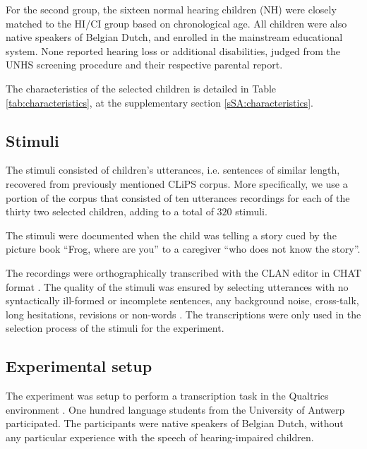 For the second group, the sixteen normal hearing children (NH) were closely matched to the HI/CI group based on chronological age. All children were also native speakers of Belgian Dutch, and enrolled in the mainstream educational system. None reported hearing loss or additional disabilities, judged from the UNHS screening procedure and their respective parental report.

The characteristics of the selected children is detailed in Table \ref{tab:characteristics}, at the supplementary section \ref{sSA:characteristics}. 
%
%
\subsection{Stimuli} \label{sS:stimuli}
%
The stimuli consisted of children's utterances, i.e. sentences of similar length, recovered from previously mentioned CLiPS corpus. More specifically, we use a portion of the corpus that consisted of ten utterances recordings for each of the thirty two selected children, adding to a total of $320$ stimuli. 

The stimuli were documented when the child was telling a story cued by the picture book ``Frog, where are you'' \citep{Mayer_1969} to a caregiver ``who does not know the story''. 

The recordings were orthographically transcribed with the CLAN editor in CHAT format \cite{MacWhinney_2020}. The quality of the stimuli was ensured by selecting utterances with no syntactically ill-formed or incomplete sentences, any background noise, cross-talk, long hesitations, revisions or non-words \citep{Boonen_et_al_2021}. The transcriptions were only used in the selection process of the stimuli for the experiment. 
%
\begin{comment}
	under the Design of Experiments (DoE) literature, we would say we have $32$ experimental units with $10$ replicate runs each, making a total of $320$ experimental runs. As it is defined in \citet{Lawson_2015}, an experimental unit is the item under study upon which something is changed, while a replicate run is the experiment conducted with the same factor settings, but using different experimental units. 
\end{comment}
%
%
\subsection{Experimental setup} \label{sS:setup}
%
The experiment was setup to perform a transcription task in the Qualtrics environment \cite{Qualtrics_2005}. One hundred language students from the University of Antwerp participated. The participants were native speakers of Belgian Dutch, without any particular experience with the speech of hearing-impaired children.

